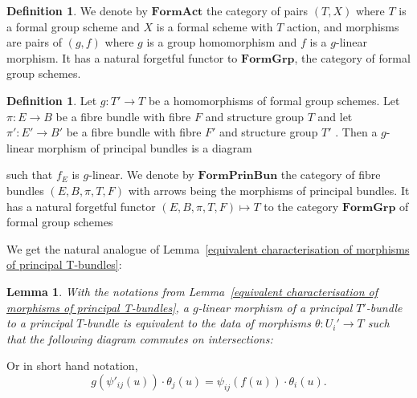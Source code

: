 \documentclass[11pt,oneside]{amsart}
\newtheorem{lemma}[theorem]{Lemma}
\theoremstyle{definition}
\newtheorem{definition}[theorem]{Definition}
\theoremstyle{remark}
\begin{document}
	\begin{definition}
		We denote by $\mathbf{FormAct}$ the category of pairs $(T,X)$ where $T$ is a formal group scheme and $X$ is a formal scheme with $T$ action, and morphisms are pairs of $(g,f)$ where $g$ is a group homomorphism and $f$ is a $g$-linear morphism. It has a natural forgetful functor to $
		\mathbf{FormGrp}$, the category of formal group schemes.
	\end{definition}
	
	\begin{definition}
		Let $g:T'\rightarrow T$ be a homomorphisms of formal group schemes. Let $\pi:E\rightarrow B$ be a fibre bundle with fibre $F$ and structure group $T$ and let $\pi':E'\rightarrow B'$ be a fibre bundle with fibre $F'$ and structure group $T'$ . Then a $g$-linear morphism of principal bundles is a diagram
		\begin{center}
		\end{center}		
		such that $f_E$ is $g$-linear. We denote by $\mathbf{ FormPrinBun}$ the category of fibre bundles $(E,B,\pi,T,F)$ with arrows being the morphisms of principal bundles. It has a natural forgetful functor $(E,B,\pi,T,F) \mapsto T$ to the category $\mathbf{FormGrp}$ of formal group schemes
	\end{definition}
	We get the natural analogue of Lemma~\ref{equivalent characterisation of morphisms of principal T-bundles}:
	
	\begin{lemma}
		With the notations from Lemma~\ref{equivalent characterisation of morphisms of principal T-bundles}, a $g$-linear morphism of a principal $T'$-bundle to a principal $T$-bundle is equivalent to the data of morphisms $\theta: U_i'\rightarrow T$ such that the following diagram commutes on intersections:
		\begin{center}
		\end{center}
	\end{lemma}
	Or in short hand notation,
	\begin{equation}\label{shorthand for description of semi-linear morphism of fibre  bundles}
	g(\psi'_{ij}(u))\cdot\theta_j(u)=\psi_{ij}(f(u))\cdot \theta_i(u).
	\end{equation}
	
\end{document}

